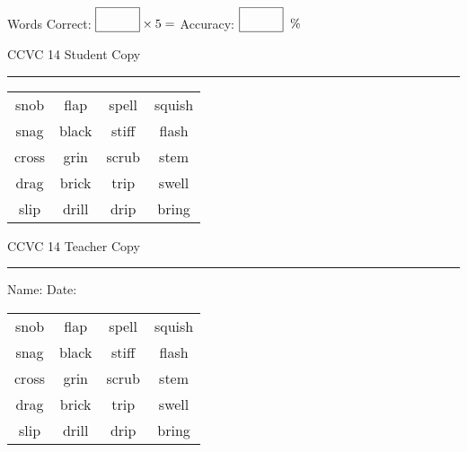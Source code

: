 \documentclass{memoir}
\begin{document}
\normalsize

Words Correct: $\fbox{\phantom{\huge 100}} \times 5 = $ Accuracy: $\fbox{\phantom{\huge 100}}\;\; \%$ 

\vfill

\newpage


\footnotesize \noindent
CCVC 14 \hfill Student Copy
\smallskip
\hrule

\Large

\setlength{\tabcolsep}{14pt}
\def\arraystretch{3}

{\selectfont


\begin{vplace}[0.5]
\begin{center}
\begin{tabular}{cccc}
snob & flap            & spell & squish \\
snag & black            & stiff & flash             \\
cross & grin     & scrub & stem \\
drag        & brick       & trip & swell \\
slip & drill & drip & bring      \\
\end{tabular}
\end{center}
\end{vplace}

}

\newpage

\footnotesize \noindent
CCVC 14 \hfill Teacher Copy
\smallskip
\hrule

\normalsize

\vfill

\noindent
Name: \underline{\hspace{1.75in}} \hfill Date: \underline{\hspace{1in}}

\Large

{\selectfont


\begin{vplace}[0.5]
\begin{center}
\begin{tabular}{cccc}
snob & flap            & spell & squish \\
snag & black            & stiff & flash             \\
cross & grin     & scrub & stem \\
drag        & brick       & trip & swell \\
slip & drill & drip & bring      \\
\end{tabular}
\end{center}
\end{vplace}



}
\end{document}

